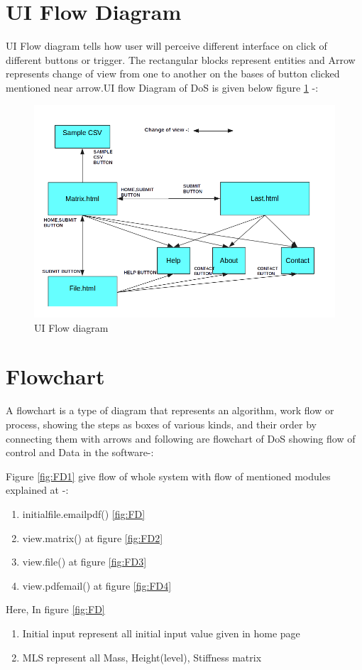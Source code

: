 \section{UI Flow Diagram}
UI Flow diagram tells how user will perceive different interface on click of different buttons or trigger. The rectangular blocks represent entities and Arrow represents change of view from one to another on the bases of button clicked mentioned near arrow.UI flow Diagram of DoS is given below figure \ref{fig:UI1} -: 
\begin{figure}[H]
\centering \includegraphics[scale=0.55]{images/UI.png}
\caption{UI Flow diagram}
\label{fig:UI1}
\end{figure}
\section{Flowchart}
A flowchart is a type of diagram that represents an algorithm, work flow or process, showing the steps as boxes of various kinds, and their order by connecting them with arrows
and following are flowchart of DoS showing flow of control and Data in the software-:

Figure \ref{fig:FD1} give flow of whole system with flow of mentioned modules explained at -:
\begin{enumerate}

\item initialfile.emailpdf() \ref{fig:FD}
\item view.matrix() at figure \ref{fig:FD2}
\item view.file() at figure \ref{fig:FD3}
\item view.pdfemail() at figure \ref{fig:FD4}
\end{enumerate}
Here, In figure \ref{fig:FD}
\begin{enumerate}
\item Initial input represent all initial input value given in home page
\item MLS represent all Mass, Height(level), Stiffness matrix
\end{enumerate}

